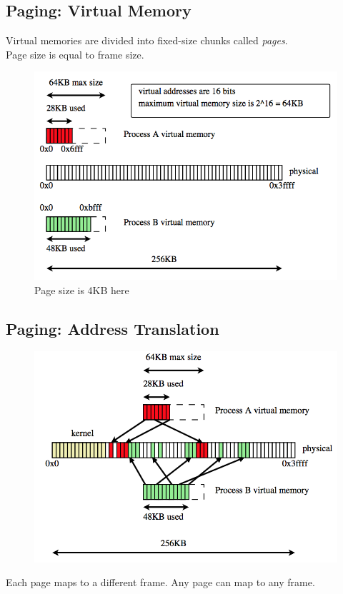 \documentclass[12pt]{article}
\theoremstyle{plain}
\theoremstyle{definition}
\begin{document}
\subsection{Paging: Virtual Memory}
Virtual memories are divided into fixed-size chunks called \emph{pages}. \\
Page size is equal to frame size.
\begin{figure}[!h]
  \centering
  \includegraphics[scale=0.8]{pictures/paging_v_mem.png}
  \caption{Page size is 4KB here}
  \label{fig:p_v_mem}
\end{figure}

\subsection{Paging: Address Translation}
\begin{figure}[!h]
  \centering
  \includegraphics[scale=0.7]{pictures/p_translation.png}
  \label{fig:p_trans}
\end{figure}
Each page maps to a different frame.
Any page can map to any frame.
\end{document}
